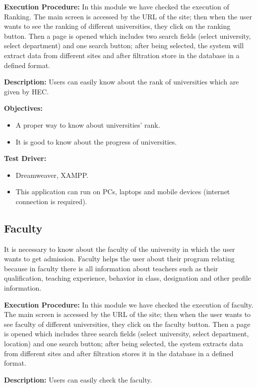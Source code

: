 \textbf{Execution Procedure:}
In this module we have checked the execution of Ranking. The main screen is accessed by the URL of the site; then when the user wants to see the ranking of different universities, they click on the ranking button. Then a page is opened which includes two search fields (select university, select department) and one search button; after being selected, the system will extract data from different sites and after filtration store in the database in a defined format.

\textbf{Description:} Users can easily know about the rank of universities which are given by HEC.

\textbf{Objectives:}
\begin{itemize}
    \item A proper way to know about universities' rank.
    \item It is good to know about the progress of universities.
\end{itemize}

\textbf{Test Driver:}
\begin{itemize}
    \item Dreamweaver, XAMPP.
    \item This application can run on PCs, laptops and mobile devices (internet connection is required).
\end{itemize}

\subsection{Faculty}

It is necessary to know about the faculty of the university in which the user wants to get admission. Faculty helps the user about their program relating because in faculty there is all information about teachers such as their qualification, teaching experience, behavior in class, designation and other profile information.

\textbf{Execution Procedure:}
In this module we have checked the execution of faculty. The main screen is accessed by the URL of the site; then when the user wants to see faculty of different universities, they click on the faculty button. Then a page is opened which includes three search fields (select university, select department, location) and one search button; after being selected, the system extracts data from different sites and after filtration stores it in the database in a defined format.

\textbf{Description:} Users can easily check the faculty.

